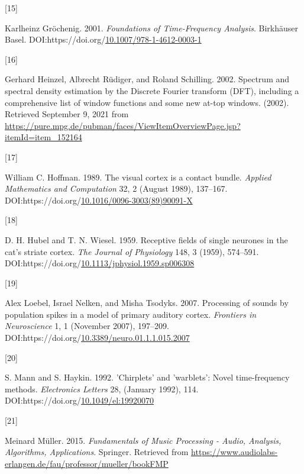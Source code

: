 \documentclass[
  american,
]{article}
\newlength{\cslhangindent}
\newlength{\csllabelwidth}
\newlength{\cslentryspacingunit} %
\newenvironment{CSLReferences}[2] %
 {%
  \setlength{\parindent}{0pt}
  \ifodd #1
  \let\oldpar\par
  \def\par{\hangindent=\cslhangindent\oldpar}
  \fi
  \setlength{\parskip}{#2\cslentryspacingunit}
 }%
 {}
\newcommand{\CSLLeftMargin}[1]{\parbox[t]{\csllabelwidth}{#1}}
\newcommand{\CSLRightInline}[1]{\parbox[t]{\linewidth - \csllabelwidth}{#1}\break}
\begin{document}
\begin{CSLReferences}{0}{0}
\leavevmode{}%
\CSLLeftMargin{{[}15{]} }
\CSLRightInline{Karlheinz Gröchenig. 2001. \emph{Foundations of {Time}-{Frequency} {Analysis}}. Birkhäuser Basel. DOI:https://doi.org/\href{https://doi.org/10.1007/978-1-4612-0003-1}{10.1007/978-1-4612-0003-1}}

\leavevmode{}%
\CSLLeftMargin{{[}16{]} }
\CSLRightInline{Gerhard Heinzel, Albrecht Rüdiger, and Roland Schilling. 2002. Spectrum and spectral density estimation by the {Discrete} {Fourier} transform ({DFT}), including a comprehensive list of window functions and some new at-top windows. (2002). Retrieved September 9, 2021 from \url{https://pure.mpg.de/pubman/faces/ViewItemOverviewPage.jsp?itemId=item_152164}}

\leavevmode{}%
\CSLLeftMargin{{[}17{]} }
\CSLRightInline{William C. Hoffman. 1989. The visual cortex is a contact bundle. \emph{Applied Mathematics and Computation} 32, 2 (August 1989), 137--167. DOI:https://doi.org/\href{https://doi.org/10.1016/0096-3003(89)90091-X}{10.1016/0096-3003(89)90091-X}}

\leavevmode{}%
\CSLLeftMargin{{[}18{]} }
\CSLRightInline{D. H. Hubel and T. N. Wiesel. 1959. Receptive fields of single neurones in the cat's striate cortex. \emph{The Journal of Physiology} 148, 3 (1959), 574--591. DOI:https://doi.org/\href{https://doi.org/10.1113/jphysiol.1959.sp006308}{10.1113/jphysiol.1959.sp006308}}

\leavevmode{}%
\CSLLeftMargin{{[}19{]} }
\CSLRightInline{Alex Loebel, Israel Nelken, and Misha Tsodyks. 2007. Processing of sounds by population spikes in a model of primary auditory cortex. \emph{Frontiers in Neuroscience} 1, 1 (November 2007), 197--209. DOI:https://doi.org/\href{https://doi.org/10.3389/neuro.01.1.1.015.2007}{10.3389/neuro.01.1.1.015.2007}}

\leavevmode{}%
\CSLLeftMargin{{[}20{]} }
\CSLRightInline{S. Mann and S. Haykin. 1992. '{Chirplets}' and 'warblets': Novel time-frequency methods. \emph{Electronics Letters} 28, (January 1992), 114. DOI:https://doi.org/\href{https://doi.org/10.1049/el:19920070}{10.1049/el:19920070}}

\leavevmode{}%
\CSLLeftMargin{{[}21{]} }
\CSLRightInline{Meinard Müller. 2015. \emph{Fundamentals of {Music} {Processing} - {Audio}, {Analysis}, {Algorithms}, {Applications}}. Springer. Retrieved from \url{https://www.audiolabs-erlangen.de/fau/professor/mueller/bookFMP}}


\end{CSLReferences}
\end{document}

